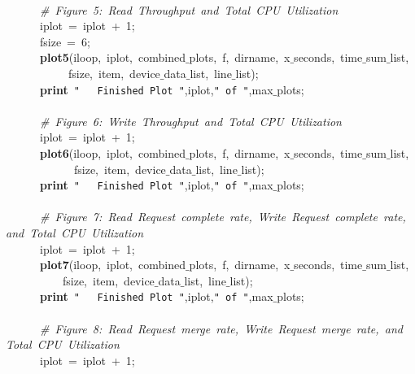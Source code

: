\mbox{}\ \ \ \ \ \  \\
\mbox{}\ \ \ \ \ \ \textit{\#\ Figure\ 5:\ Read\ Throughput\ and\ Total\ CPU\ Utilization} \\
\mbox{}\ \ \ \ \ \ iplot\ =\ iplot\ +\ 1; \\
\mbox{}\ \ \ \ \ \ fsize\ =\ 6; \\
\mbox{}\ \ \ \ \ \ \textbf{plot5}(iloop,\ iplot,\ combined$\_$plots,\ f,\ dirname,\ x$\_$seconds,\ time$\_$sum$\_$list, \\
\mbox{}\ \ \ \ \ \ \ \ \ \ \ fsize,\ item,\ device$\_$data$\_$list,\ line$\_$list); \\
\mbox{}\ \ \ \ \ \ \textbf{print}\ \texttt{"{}\ \ \ Finished\ Plot\ "{}},iplot,\texttt{"{}\ of\ "{}},max$\_$plots; \\
\mbox{}\ \ \ \ \ \  \\
\mbox{}\ \ \ \ \ \ \textit{\#\ Figure\ 6:\ Write\ Throughput\ and\ Total\ CPU\ Utilization} \\
\mbox{}\ \ \ \ \ \ iplot\ =\ iplot\ +\ 1; \\
\mbox{}\ \ \ \ \ \ \textbf{plot6}(iloop,\ iplot,\ combined$\_$plots,\ f,\ dirname,\ x$\_$seconds,\ time$\_$sum$\_$list, \\
\mbox{}\ \ \ \ \ \ \ \ \ \ \ \ fsize,\ item,\ device$\_$data$\_$list,\ line$\_$list); \\
\mbox{}\ \ \ \ \ \ \textbf{print}\ \texttt{"{}\ \ \ Finished\ Plot\ "{}},iplot,\texttt{"{}\ of\ "{}},max$\_$plots; \\
\mbox{}\ \ \ \ \ \  \\
\mbox{}\ \ \ \ \ \ \textit{\#\ Figure\ 7:\ Read\ Request\ complete\ rate,\ Write\ Request\ complete\ rate,\ and\ Total\ CPU\ Utilization} \\
\mbox{}\ \ \ \ \ \ iplot\ =\ iplot\ +\ 1; \\
\mbox{}\ \ \ \ \ \ \textbf{plot7}(iloop,\ iplot,\ combined$\_$plots,\ f,\ dirname,\ x$\_$seconds,\ time$\_$sum$\_$list, \\
\mbox{}\ \ \ \ \ \ \ \ \ \ fsize,\ item,\ device$\_$data$\_$list,\ line$\_$list); \\
\mbox{}\ \ \ \ \ \ \textbf{print}\ \texttt{"{}\ \ \ Finished\ Plot\ "{}},iplot,\texttt{"{}\ of\ "{}},max$\_$plots; \\
\mbox{}\ \ \ \ \ \  \\
\mbox{}\ \ \ \ \ \ \textit{\#\ Figure\ 8:\ Read\ Request\ merge\ rate,\ Write\ Request\ merge\ rate,\ and\ Total\ CPU\ Utilization} \\
\mbox{}\ \ \ \ \ \ iplot\ =\ iplot\ +\ 1; \\
